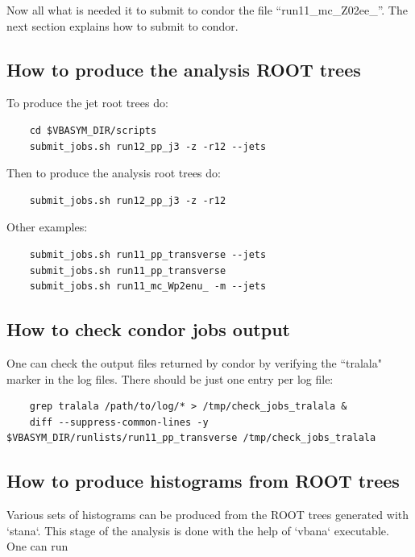 \documentclass[12pt]{article}
\begin{document}
Now all what is needed it to submit to condor the file ``run11\_mc\_Z02ee\_''. The
next section explains how to submit to condor.


\subsection{How to produce the analysis ROOT trees}

To produce the jet root trees do:

\begin{lstlisting}
    cd $VBASYM_DIR/scripts
    submit_jobs.sh run12_pp_j3 -z -r12 --jets
\end{lstlisting}

Then to produce the analysis root trees do:

\begin{lstlisting}
    submit_jobs.sh run12_pp_j3 -z -r12
\end{lstlisting}

Other examples:

\begin{lstlisting}
    submit_jobs.sh run11_pp_transverse --jets
    submit_jobs.sh run11_pp_transverse
    submit_jobs.sh run11_mc_Wp2enu_ -m --jets
\end{lstlisting}

\subsection{How to check condor jobs output}

One can check the output files returned by condor by verifying the ``tralala"
marker in the log files. There should be just one entry per log file:

\begin{lstlisting}
    grep tralala /path/to/log/* > /tmp/check_jobs_tralala &
    diff --suppress-common-lines -y $VBASYM_DIR/runlists/run11_pp_transverse /tmp/check_jobs_tralala
\end{lstlisting}

\subsection{How to produce histograms from ROOT trees}

Various sets of histograms can be produced from the ROOT trees generated with
`stana`. This stage of the analysis is done with the help of `vbana` executable.
One can run
\end{document}
